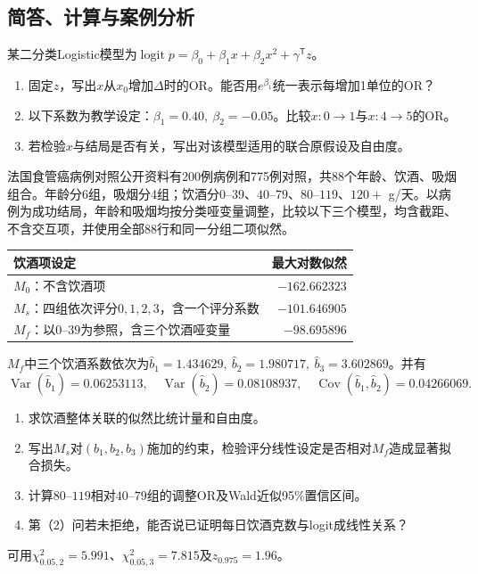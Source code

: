 \subsection{简答、计算与案例分析}

某二分类Logistic模型为$\operatorname{logit}p=\beta_0+\beta_1x+\beta_2x^2+\gamma^{\mathsf T}z$。\begin{enumerate}\item 固定$z$，写出$x$从$x_0$增加$\Delta$时的OR。能否用$e^{\beta_1}$统一表示每增加1单位的OR？\item 以下系数为教学设定：$\beta_1=0.40,\ \beta_2=-0.05$。比较$x:0\to1$与$x:4\to5$的OR。\item 若检验$x$与结局是否有关，写出对该模型适用的联合原假设及自由度。\end{enumerate}

\par\noindent\begin{minipage}{\linewidth}
法国食管癌病例对照公开资料有200例病例和775例对照，共88个年龄、饮酒、吸烟组合。年龄分6组，吸烟分4组；饮酒分$0$--$39$、$40$--$79$、$80$--$119$、$120+$ g/天。以病例为成功结局，年龄和吸烟均按分类哑变量调整，比较以下三个模型，均含截距、不含交互项，并使用全部88行和同一分组二项似然。\begin{center}\small\begin{tabular}{lr}\toprule 饮酒项设定&最大对数似然\\\midrule $M_0$：不含饮酒项&$-162.662323$\\$M_s$：四组依次评分$0,1,2,3$，含一个评分系数&$-101.646905$\\$M_f$：以$0$--$39$为参照，含三个饮酒哑变量&$-98.695896$\\\bottomrule \end{tabular}\end{center}$M_f$中三个饮酒系数依次为$\hat b_1=1.434629,\ \hat b_2=1.980717,\ \hat b_3=3.602869$。并有\[\operatorname{Var}(\hat b_1)=0.06253113,\quad\operatorname{Var}(\hat b_2)=0.08108937,\quad\operatorname{Cov}(\hat b_1,\hat b_2)=0.04266069.\]\begin{enumerate}\item 求饮酒整体关联的似然比统计量和自由度。\item 写出$M_s$对$(b_1,b_2,b_3)$施加的约束，检验评分线性设定是否相对$M_f$造成显著拟合损失。\item 计算$80$--$119$相对$40$--$79$组的调整OR及Wald近似95\%置信区间。\item 第（2）问若未拒绝，能否说已证明每日饮酒克数与logit成线性关系？\end{enumerate}可用$\chi^2_{0.05,2}=5.991$、$\chi^2_{0.05,3}=7.815$及$z_{0.975}=1.96$。
\end{minipage}\par\medskip

